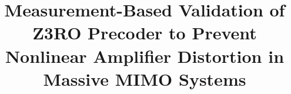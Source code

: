 \documentclass[conference]{IEEEtran}
\newcommand{\thomas}[1]{{\color{red}[Thomas: #1]}}
\newcommand{\liesbet}[1]{{\color{olive}[Liesbet: #1]}}
\newcommand{\francois}[1]{{\color{blue}[François: #1]}}
\begin{document}
\title{Measurement-Based Validation of Z3RO Precoder to Prevent Nonlinear Amplifier Distortion in Massive MIMO Systems}


\end{document}
